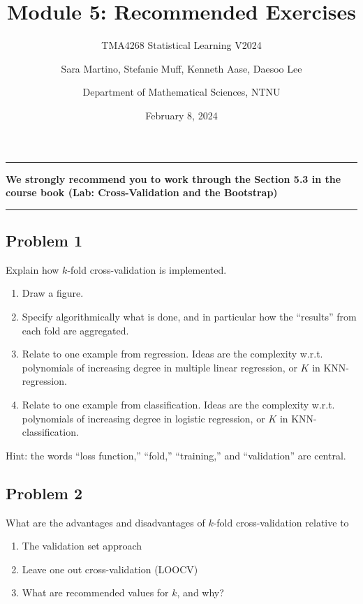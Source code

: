 \documentclass[
]{article}
\title{Module 5: Recommended Exercises}
\subtitle{TMA4268 Statistical Learning V2024}
\author{Sara Martino, Stefanie Muff, Kenneth Aase, Daesoo
Lee \and Department of Mathematical Sciences, NTNU}
\date{February 8, 2024}
\providecommand{\tightlist}{%
  \setlength{\itemsep}{0pt}\setlength{\parskip}{0pt}}
\begin{document}
\maketitle

\begin{center}\rule{0.5\linewidth}{0.5pt}\end{center}

\textbf{We strongly recommend you to work through the Section 5.3 in the
course book (Lab: Cross-Validation and the Bootstrap)}

\begin{center}\rule{0.5\linewidth}{0.5pt}\end{center}

\hypertarget{problem-1}{%
\subsection{Problem 1}\label{problem-1}}

Explain how \(k\)-fold cross-validation is implemented.

\begin{enumerate}
\def\labelenumi{\alph{enumi})}
\item
  Draw a figure.
\item
  Specify algorithmically what is done, and in particular how the
  ``results'' from each fold are aggregated.
\item
  Relate to one example from regression. Ideas are the complexity w.r.t.
  polynomials of increasing degree in multiple linear regression, or
  \(K\) in KNN-regression.
\item
  Relate to one example from classification. Ideas are the complexity
  w.r.t. polynomials of increasing degree in logistic regression, or
  \(K\) in KNN-classification.
\end{enumerate}

Hint: the words ``loss function,'' ``fold,'' ``training,'' and
``validation'' are central.

\hypertarget{problem-2}{%
\subsection{Problem 2}\label{problem-2}}

What are the advantages and disadvantages of \(k\)-fold cross-validation
relative to

\begin{enumerate}
\def\labelenumi{\alph{enumi})}
\tightlist
\item
  The validation set approach
\item
  Leave one out cross-validation (LOOCV)
\item
  What are recommended values for \(k\), and why?
\end{enumerate}
\end{document}
